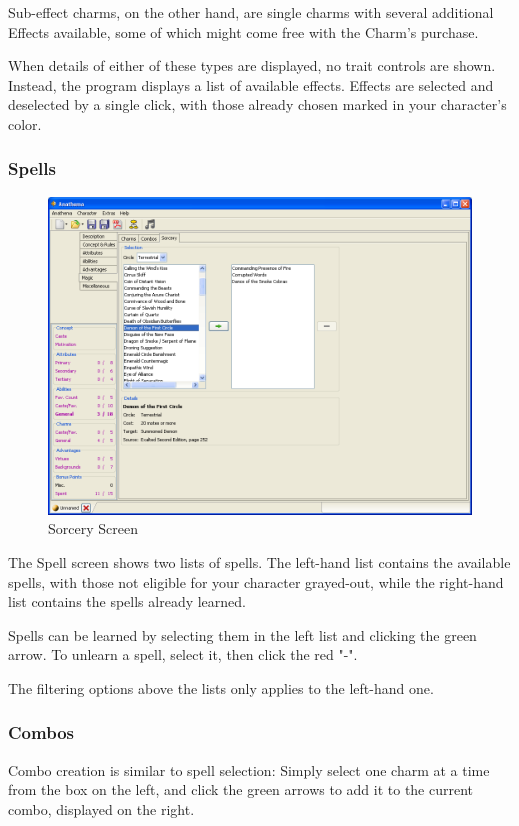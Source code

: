 Sub-effect charms, on the other hand, are single charms with several additional Effects available, some of which might come free with the Charm's purchase.

When details of either of these types are displayed, no trait controls are shown. Instead, the program displays a list of available effects. Effects are selected and deselected by a single click, with those already chosen marked in your character's color.

\subsubsection{Spells}
\begin{figure}
	\centering
		\includegraphics[width=1.00\textwidth]{images/Spells.png}
	\caption{Sorcery Screen}
	\label{fig:Spells}
\end{figure}

The Spell screen shows two lists of spells. The left-hand list contains the available spells, with those not eligible for your character grayed-out, while the right-hand list contains the spells already learned.

Spells can be learned by selecting them in the left list and clicking the green arrow. To unlearn a spell, select it, then click the red "-". 

The filtering options above the lists only applies to the left-hand one.


\subsubsection{Combos}
Combo creation is similar to spell selection: Simply select one charm at a time from the box on the left, and click the green arrows to add it to the current combo, displayed on the right. 

